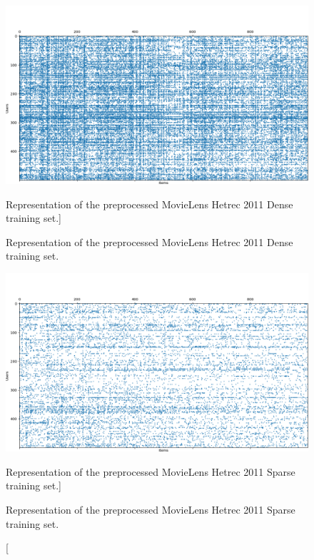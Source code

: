 \begin{figure}[htb]
\centering
\includegraphics[width=\textwidth]{pictures/movielens-dense-target}
\caption
[Representation of the preprocessed MovieLens Hetrec 2011 Dense training set.]
{\protect\raggedright Representation of the preprocessed MovieLens Hetrec 2011 Dense training set.}
\includegraphics[width=\textwidth]{pictures/movielens-sparse-target}
\caption
[Representation of the preprocessed MovieLens Hetrec 2011 Sparse training set.]
{\protect\raggedright Representation of the preprocessed MovieLens Hetrec 2011 Sparse training set.}
\end{figure}


